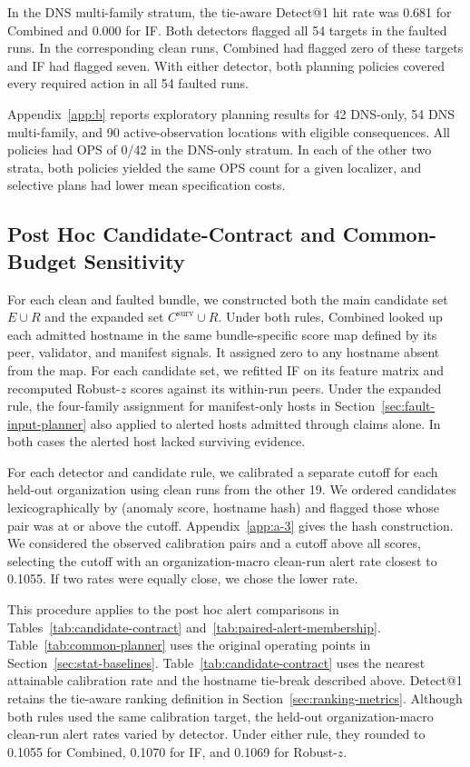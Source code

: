 \documentclass[sn-basic]{sn-jnl}%
\theoremstyle{thmstyleone}%
\theoremstyle{thmstyletwo}%
\theoremstyle{thmstylethree}%
\begin{document}
In the DNS multi-family stratum, the tie-aware Detect@1 hit rate was 0.681 for Combined and 0.000 for IF. Both detectors flagged all 54 targets in the faulted runs. In the corresponding clean runs, Combined had flagged zero of these targets and IF had flagged seven. With either detector, both planning policies covered every required action in all 54 faulted runs.

Appendix~\ref{app:b} reports exploratory planning results for 42 DNS-only, 54 DNS multi-family, and 90 active-observation locations with eligible consequences. All policies had OPS of 0/42 in the DNS-only stratum. In each of the other two strata, both policies yielded the same OPS count for a given localizer, and selective plans had lower mean specification costs.

\subsection{Post Hoc Candidate-Contract and Common-Budget Sensitivity}\label{sec:candidate-contract-sensitivity}

For each clean and faulted bundle, we constructed both the main candidate set \(E \cup R\) and the expanded set \(C^{\mathrm{surv}} \cup R\). Under both rules, Combined looked up each admitted hostname in the same bundle-specific score map defined by its peer, validator, and manifest signals. It assigned zero to any hostname absent from the map. For each candidate set, we refitted IF on its feature matrix and recomputed Robust-\(z\) scores against its within-run peers. Under the expanded rule, the four-family assignment for manifest-only hosts in Section~\ref{sec:fault-input-planner} also applied to alerted hosts admitted through claims alone. In both cases the alerted host lacked surviving evidence.

For each detector and candidate rule, we calibrated a separate cutoff for each held-out organization using clean runs from the other 19. We ordered candidates lexicographically by (anomaly score, hostname hash) and flagged those whose pair was at or above the cutoff. Appendix~\ref{app:a-3} gives the hash construction. We considered the observed calibration pairs and a cutoff above all scores, selecting the cutoff with an organization-macro clean-run alert rate closest to 0.1055. If two rates were equally close, we chose the lower rate.

This procedure applies to the post hoc alert comparisons in Tables~\ref{tab:candidate-contract} and~\ref{tab:paired-alert-membership}. Table~\ref{tab:common-planner} uses the original operating points in Section~\ref{sec:stat-baselines}. Table~\ref{tab:candidate-contract} uses the nearest attainable calibration rate and the hostname tie-break described above. Detect@1 retains the tie-aware ranking definition in Section~\ref{sec:ranking-metrics}. Although both rules used the same calibration target, the held-out organization-macro clean-run alert rates varied by detector. Under either rule, they rounded to 0.1055 for Combined, 0.1070 for IF, and 0.1069 for Robust-\(z\).
\end{document}
